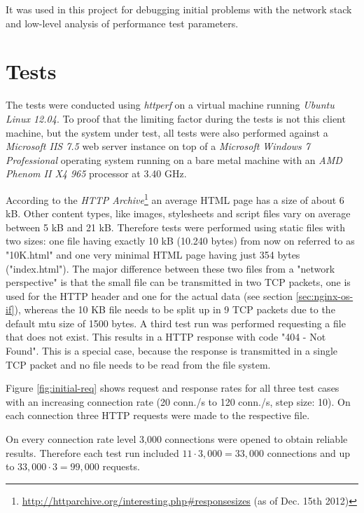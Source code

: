 It was used in this project for debugging initial problems with the network stack and low-level analysis of performance  test parameters.


\section{Tests}

The tests were conducted using \textit{httperf} on a virtual machine running \textit{Ubuntu Linux 12.04}. To proof that the limiting factor during the tests is not this client machine, but the system under test, all tests were also performed against a \textit{Microsoft IIS 7.5} web server instance on top of a \textit{Microsoft Windows 7 Professional} operating system running on a bare metal machine with an \textit{AMD Phenom II X4 965} processor at 3.40 GHz.

According to the \textit{HTTP Archive}\footnote{\url{http://httparchive.org/interesting.php\#responsesizes} (as of Dec. 15th 2012)} an average HTML page has a size of about 6 kB. Other content types, like images, stylesheets and script files vary on average between 5 kB and 21 kB. Therefore tests were performed using static files with two sizes: one file having exactly 10 kB (10.240 bytes) from now on referred to as "10K.html" and one very minimal HTML page having just 354 bytes ("index.html"). The major difference between these two files from a "network perspective" is that the small file can be transmitted in two TCP packets, one is used for the HTTP header and one for the actual data (see section \ref{sec:nginx-os-if}), whereas the 10 KB file needs to be split up in 9 TCP packets due to the default \gls{mtu} size of 1500 bytes. A third test run was performed requesting a file that does not exist. This results in a HTTP response with code "404 - Not Found". This is a special case, because the response is transmitted in a single TCP packet and no file needs to be read from the file system.

Figure \ref{fig:initial-req} shows request and response rates for all three test cases with an increasing connection rate (20 conn./s to 120 conn./s, step size: 10). On each connection three HTTP requests were made to the respective file. 

On every connection rate level 3,000 connections were opened to obtain reliable results. Therefore each test run included $11 \cdot 3,000 = 33,000$ connections and up to $33,000 \cdot 3 = 99,000$ requests.

